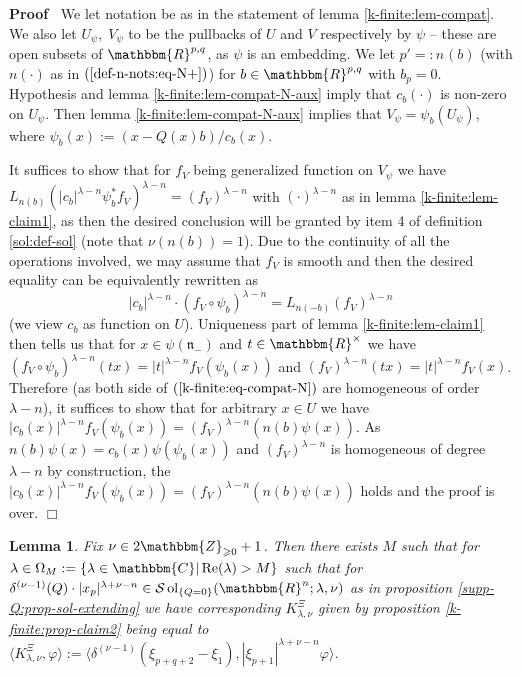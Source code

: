\documentclass{article}
\newcommand{\assign}{:=}
\newcommand{\nocomma}{}
\newcommand{\tmop}[1]{\ensuremath{\operatorname{#1}}}
\newenvironment{proof}{\noindent\textbf{Proof\ }}{\hspace*{\fill}$\Box$\medskip}
\numberwithin{definition}{section}
\newtheorem{lemma}{Lemma}
\numberwithin{lemma}{section}
\numberwithin{proposition}{section}
{\theorembodyfont{\rmfamily}\newtheorem{remark}{Remark}
\numberwithin{remark}{section}
}
\begin{document}
\begin{proof}
  We let notation be as in the statement of lemma \ref{k-finite:lem-compat}.
  We also let $U_{\psi}, \; V_{\psi}$ to be the pullbacks of $U$ and $V$
  respectively by $\psi$ -- these are open subsets of $\mathbbm{R}^{p, q}$, as
  $\psi$ is an embedding. We let $p' = : n_{} ( b)$ (with $n ( \cdot)$ as in
  $( \ref{def-n-nots:eq-N+})$) for $b \in \mathbbm{R}^{p, q}$ with $b_p = 0$.
  Hypothesis and lemma \ref{k-finite:lem-compat-N-aux} imply that $c_b (
  \cdot)$ is non-zero on $U_{\psi}$. Then lemma
  \ref{k-finite:lem-compat-N-aux} implies that $V_{\psi} = \psi_b (
  U_{\psi})$, where $\psi_b ( x) \assign ( x - Q ( x) b) / c_b ( x)$.
  
  It suffices to show that for $f_V$ being generalized function on $V_{\psi}$
  we have $L_{n ( b)} ( | c_b |^{\lambda - n} \psi_b^{\ast} f_V)^{\lambda - n}
  = ( f_V)^{\lambda - n}$ with $( \cdot)^{\lambda - n}$ as in lemma
  \ref{k-finite:lem-claim1}, as then the desired conclusion will be granted by
  item 4 of definition \ref{sol:def-sol} (note that $\nu ( n ( b)) = 1$). Due
  to the continuity of all the operations involved, we may assume that $f_V$
  is smooth and then the desired equality can be equivalently rewritten as
  \begin{equation}
    | c_b |^{\lambda - n} \cdot ( f_V \circ \psi_b^{})^{\lambda - n} = L_{n (
    - b)} ( f_V)^{\lambda - n} \label{k-finite:eq-compat-N}
  \end{equation}
  (we view $c_b$ as function on $U$). Uniqueness part of lemma
  \ref{k-finite:lem-claim1} then tells us that for $x \in \psi (
  \mathfrak{n}_-)$ and $t \in \mathbbm{R}^{\times}$ we have $( f_V \circ
  \psi_b^{})^{\lambda - n} ( t x) = | t |^{\lambda - n} f_V ( \psi_b ( x))$
  and $( f_V)^{\lambda - n} ( t x) = | t |^{\lambda - n} f_V ( x)$. Therefore
  (as both side of $( \ref{k-finite:eq-compat-N})$ are homogeneous of order
  $\lambda - n$), it suffices to show that for arbitrary $x \in U$ we have $|
  c_b ( x) |^{\lambda - n} f_V ( \psi_b ( x)) = ( f_V)^{\lambda - n} ( n ( b)
  \psi_{} ( x))$. As $n ( b) \psi ( x) = c_b ( x) \psi ( \psi_b ( x))$ and $(
  f_V)^{\lambda - n}$ is homogeneous of degree $\lambda - n$ by construction,
  the $| c_b ( x) |^{\lambda - n} f_V ( \psi_b ( x)) = ( f_V)^{\lambda - n} (
  n ( b) \psi_{} ( x))$ holds and the proof is over.
\end{proof}

\begin{lemma}
  \label{k-finite:lem-c1}Fix $\nu \in 2\mathbbm{Z}_{\geqslant 0} + 1$. Then
  there exists $M$ such that for $\lambda \in \Omega_M \assign \{ \lambda \in
  \mathbbm{C} | \tmop{Re} ( \lambda) > M \}$ such that for $\delta^{( \nu -
  1)} ( Q) \cdot | x_p |^{\lambda + \nu - n} \in \mathcal{S} \tmop{ol}_{\{ Q =
  0 \}} ( \mathbbm{R}^n ; \lambda, \nu)$ as in proposition
  \ref{supp-Q:prop-sol-extending} we have corresponding $K^{\Xi}_{\lambda,
  \nu}$ given by proposition \ref{k-finite:prop-claim2} being equal to
  $\langle K_{\lambda, \nu}^{\Xi}, \varphi \rangle \assign \langle \delta^{(
  \nu - 1)} ( \xi_{p + q + 2} - \xi_1) \nocomma, | \xi_{p + 1} |^{\lambda +
  \nu - n} \varphi \nocomma \rangle$.
\end{lemma}
\end{document}
